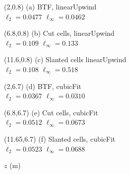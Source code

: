 \documentclass{article}
\begin{document}
\TPMargin{1pt}
\begin{textblock}{4}(2,0.8)
\normalsize
(a) BTF, linearUpwind \\
\hspace*{0.3em}$\ell_2 = \num{0.0477}$
\hspace*{1em}$\ell_\infty = \num{0.0462}$
\end{textblock}
\begin{textblock}{4}(6.8,0.8)
\normalsize
(b) Cut cells, linearUpwind \\
\hspace*{0.3em}$\ell_2 = \num{0.109}$
\hspace*{1em}$\ell_\infty = \num{0.133}$
\end{textblock}
\begin{textblock}{4}(11.6,0.8)
\normalsize
(c) Slanted cells linearUpwind \\
\hspace*{0.3em}$\ell_2 = \num{0.108}$
\hspace*{1em}$\ell_\infty = \num{0.518}$
\end{textblock}
\begin{textblock}{4}(2,6.7)
\normalsize
(d) BTF, cubicFit \\
\hspace*{0.3em}$\ell_2 = \num{0.0367}$
\hspace*{1em}$\ell_\infty = \num{0.0310}$
\end{textblock}
\begin{textblock}{4}(6.8,6.7)
\normalsize
(e) Cut cells, cubicFit \\
\hspace*{0.3em}$\ell_2 = \num{0.0512}$
\hspace*{1em}$\ell_\infty = \num{0.0673}$
\end{textblock}
\begin{textblock}{4}(11.65,6.7)
\normalsize
(f) Slanted cells, cubicFit \\
\hspace*{0.3em}$\ell_2 = \num{0.0523}$
\hspace*{1em}$\ell_\infty = \num{0.0688}$
\end{textblock}
$z$ (\si{\meter})  \\
\end{document}
